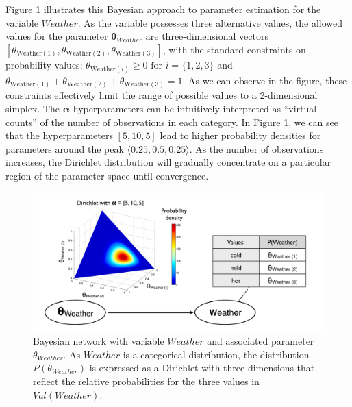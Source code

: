 Figure \ref{fig:baysianlearning} illustrates this Bayesian approach to parameter estimation for the variable $\mathit{Weather}$.  As the variable possesses three alternative values, the allowed values for the parameter $\boldsymbol\theta_{\mathit{Weather}}$ are three-dimensional vectors $[ \theta_{\mathrm{Weather}(1)}, \theta_{\mathrm{Weather}(2)}, \theta_{\mathrm{Weather}(3)} ]$, with the standard constraints on probability values: $\theta_{\mathrm{Weather}(i)} \geq 0 \text{ for } i=\{1,2,3\} $ and $\theta_{\mathrm{Weather}(1)} + \theta_{\mathrm{Weather}(2)} + \theta_{\mathrm{Weather}(3)} = 1$.   As we can observe in the figure, these constraints effectively limit the range of possible values to a 2-dimensional simplex. The $\boldsymbol\alpha$ hyperparameters can be intuitively interpreted as ``virtual counts'' of the number of observations in each category.   In Figure \ref{fig:baysianlearning}, we can see that the hyperparameters $[5,10,5]$ lead to higher probability densities for parameters around the peak $\langle 0.25, 0.5, 0.25 \rangle$.  As the number of observations increases, the Dirichlet distribution will gradually concentrate on a particular region of the parameter space until convergence.


\begin{figure}[h]
\centering
\includegraphics[scale=0.28]{imgs/bayesianlearning.pdf}
\caption{Bayesian network with variable $\mathit{Weather}$ and associated parameter $\theta_{Weather}$.  As $\mathit{Weather}$ is a categorical distribution, the distribution $P(\theta_{Weather})$ is expressed as a Dirichlet with three dimensions that reflect the relative probabilities for the three values in $Val(\mathit{Weather})$. }
\label{fig:baysianlearning}
\end{figure}

